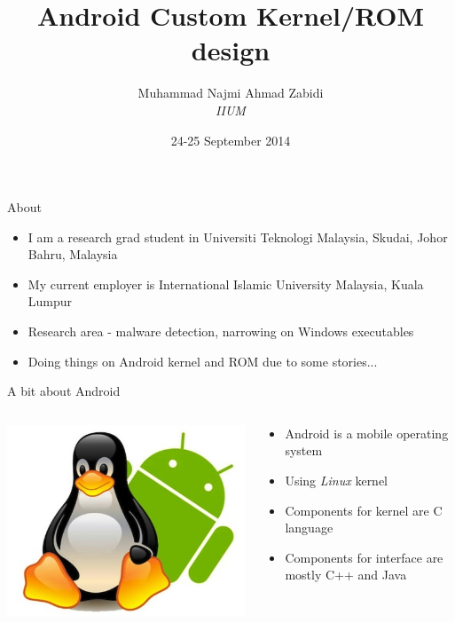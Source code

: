 \documentclass{beamer}
\title[MOSC 2014\hspace{2em}\insertframenumber/\inserttotalframenumber]{\fontUbuntuCondensed Android Custom Kernel/ROM design}
\author[Muhammad Najmi]{Muhammad Najmi Ahmad Zabidi\\
[1.7ex]\tiny{\textit{IIUM}}}
\institute{MOSC 2014\\Menara SSM \\ Kuala Lumpur, Malaysia}
\date{24-25 September 2014}
\begin{document}
 
\maketitle

\lstset{basicstyle=\ttfamily\tiny}

\begin{frame}{About}
 \begin{itemize}
  \item I am a research grad student in Universiti Teknologi Malaysia, Skudai, Johor Bahru, Malaysia
  \item My current employer is International Islamic University Malaysia, Kuala Lumpur
  \item Research area - malware detection, narrowing on Windows executables
  \item Doing things on Android kernel and ROM due to some stories...
 \end{itemize}

\end{frame}

\begin{frame}{A bit about Android}

\begin{columns}[t]
 \begin{column}{5cm}
  
 \includegraphics[scale=0.35]{linux-android.jpg}
 
 
 \end{column}


\begin{column}{5cm}
 
 
 \begin{itemize}
  \item Android is a mobile operating system
  \item Using \emph{Linux} kernel
  \item Components for kernel are C language
  \item Components for interface are mostly C++ and Java
 \end{itemize}

 
\end{column}

 \end{columns}
 
\end{frame}
\end{document}
